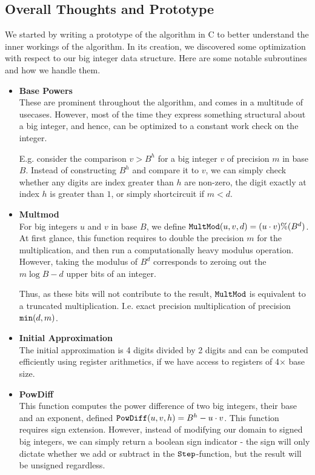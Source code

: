 \subsection{Overall Thoughts and Prototype}
\label{subsec:divproto}
{}

We started by writing a prototype of the algorithm in C to better understand the
inner workings of the algorithm. In its creation, we discovered some
optimization with respect to our big integer data structure. Here are some
notable subroutines and how we handle them.

\begin{itemize}[leftmargin=*]
\item \textbf{Base Powers}\\
  These are prominent throughout the algorithm, and comes in a multitude of
  usecases. However, most of the time they express something structural about a
  big integer, and hence, can be optimized to a constant work check on the
  integer.

  E.g. consider the comparison $v > B^h$ for a big integer $v$ of precision $m$
  in base $B$. Instead of constructing $B^h$ and compare it to $v$, we can
  simply check whether any digits are index greater than $h$ are non-zero, the
  digit exactly at index $h$ is greater than $1$, or simply shortcircuit if
  $m < d$.
\item \textbf{Multmod}\\
  For big integers $u$ and $v$ in base $B$, we define
  $\mathtt{MultMod}(u,v,d) = (u \cdot v) \% (B^d)$. At first glance, this function
  requires to double the precision $m$ for the multiplication, and then run a
  computationally heavy modulus operation. However, taking the modulus of $B^d$
  corresponds to zeroing out the $m \log B - d$ upper bits of an integer.

  Thus, as these bits will not contribute to the result, $\mathtt{MultMod}$ is
  equivalent to a truncated multiplication. I.e. exact precision multiplication
  of precision $\mathtt{min}(d, m)$.

\item \textbf{Initial Approximation}\\
  The initial approximation is 4 digits divided by 2 digits and can be computed
  efficiently using register arithmetics, if we have access to registers of
  4$\times$ base size.

\item \textbf{PowDiff}\\
  This function computes the power difference of two big integers, their base
  and an exponent, defined $\mathtt{PowDiff}(u, v, h) = B^h - u \cdot v$. This function
  requires sign extension. However, instead of modifying our domain to signed
  big integers, we can simply return a boolean sign indicator - the sign will
  only dictate whether we add or subtract in the $\mathtt{Step}$-function, but the
  result will be unsigned regardless.


\end{itemize}
